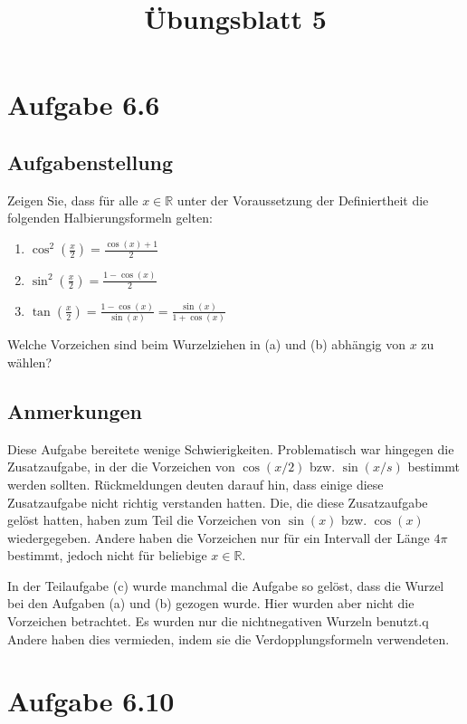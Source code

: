 \documentclass[a4paper]{article}
\title{Übungsblatt 5}
\date{}
\author{}
\newcommand*{\R}{\mathbb R}
\begin{document}
\maketitle

\section{Aufgabe 6.6}

\subsection{Aufgabenstellung}

Zeigen Sie, dass für alle $x\in\R$ unter der Voraussetzung der Definiertheit die folgenden Halbierungsformeln gelten:

\begin{enumerate}
  \item $\cos^2\left(\frac x2\right) = \frac{\cos(x)+1}{2}$
  \item $\sin^2\left(\frac x2\right) = \frac{1-\cos(x)}{2}$
  \item $\tan\left(\frac x2\right) = \frac{1-\cos(x)}{\sin(x)} = \frac{\sin(x)}{1+\cos(x)}$
\end{enumerate}

Welche Vorzeichen sind beim Wurzelziehen in (a) und (b) abhängig von $x$ zu wählen?

\subsection{Anmerkungen}

Diese Aufgabe bereitete wenige Schwierigkeiten. Problematisch war hingegen die Zusatzaufgabe, in der die Vorzeichen von $\cos(x/2)$ bzw. $\sin(x/s)$ bestimmt werden sollten. Rückmeldungen deuten darauf hin, dass einige diese Zusatzaufgabe nicht richtig verstanden hatten. Die, die diese Zusatzaufgabe gelöst hatten, haben zum Teil die Vorzeichen von $\sin(x)$ bzw. $\cos(x)$ wiedergegeben. Andere haben die Vorzeichen nur für ein Intervall der Länge $4\pi$ bestimmt, jedoch nicht für beliebige $x\in\R$.

In der Teilaufgabe (c) wurde manchmal die Aufgabe so gelöst, dass die Wurzel bei den Aufgaben (a) und (b) gezogen wurde. Hier wurden aber nicht die Vorzeichen betrachtet. Es wurden nur die nichtnegativen Wurzeln benutzt.q Andere haben dies vermieden, indem sie die Verdopplungsformeln verwendeten.

\section{Aufgabe 6.10}
\end{document}
